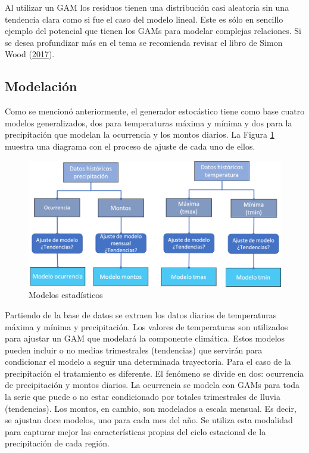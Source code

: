 \documentclass[
  12pt]{article}
\begin{document}
Al utilizar un GAM los residuos tienen una distribución casi aleatoria sin una tendencia clara como si fue el caso del modelo lineal. Este es sólo en sencillo ejemplo del potencial que tienen los GAMs para modelar complejas relaciones. Si se desea profundizar más en el tema se recomienda revisar el libro de Simon Wood (\protect\hyperlink{ref-RN3704}{2017}).

\hypertarget{modelaciuxf3n}{%
\subsection{Modelación}\label{modelaciuxf3n}}

Como se mencionó anteriormente, el generador estocástico tiene como base cuatro modelos generalizados, dos para temperaturas máxima y mínima y dos para la precipitación que modelan la ocurrencia y los montos diarios. La Figura \ref{fig:modelos} muestra una diagrama con el proceso de ajuste de cada uno de ellos.

\begin{figure}[H]

{\centering \includegraphics[width=0.7\linewidth]{./docs/figures/modelos} 

}

\caption{ Modelos estadísticos}\label{fig:modelos}
\end{figure}

Partiendo de la base de datos se extraen los datos diarios de temperaturas máxima y mínima y precipitación. Los valores de temperaturas son utilizados para ajustar un GAM que modelará la componente climática. Estos modelos pueden incluir o no medias trimestrales (tendencias) que servirán para condicionar el modelo a seguir una determinada trayectoria. Para el caso de la precipitación el tratamiento es diferente. El fenómeno se divide en dos: ocurrencia de precipitación y montos diarios. La ocurrencia se modela con GAMs para toda la serie que puede o no estar condicionado por totales trimestrales de lluvia (tendencias). Los montos, en cambio, son modelados a escala mensual. Es decir, se ajustan doce modelos, uno para cada mes del año. Se utiliza esta modalidad para capturar mejor las características propias del ciclo estacional de la precipitación de cada región.
\end{document}
